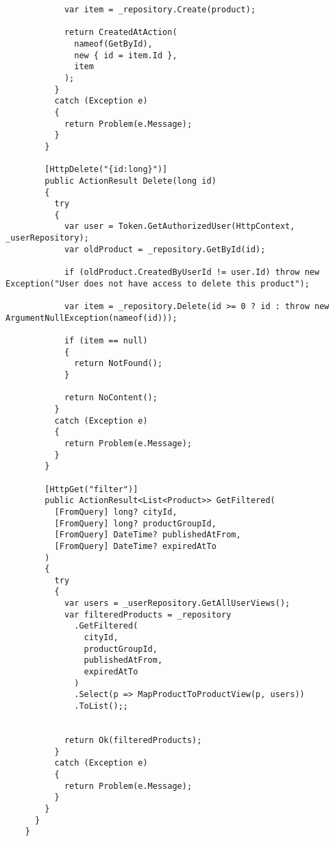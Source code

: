 \begin{lstlisting}
            var item = _repository.Create(product);
    
            return CreatedAtAction(
              nameof(GetById),
              new { id = item.Id },
              item
            );
          }
          catch (Exception e)
          {
            return Problem(e.Message);
          }
        }
    
        [HttpDelete("{id:long}")]
        public ActionResult Delete(long id)
        {
          try
          {
            var user = Token.GetAuthorizedUser(HttpContext, _userRepository);
            var oldProduct = _repository.GetById(id);
    
            if (oldProduct.CreatedByUserId != user.Id) throw new Exception("User does not have access to delete this product");
    
            var item = _repository.Delete(id >= 0 ? id : throw new ArgumentNullException(nameof(id)));
    
            if (item == null)
            {
              return NotFound();
            }
    
            return NoContent();
          }
          catch (Exception e)
          {
            return Problem(e.Message);
          }
        }
    
        [HttpGet("filter")]
        public ActionResult<List<Product>> GetFiltered(
          [FromQuery] long? cityId, 
          [FromQuery] long? productGroupId, 
          [FromQuery] DateTime? publishedAtFrom, 
          [FromQuery] DateTime? expiredAtTo
        )
        {
          try
          {
            var users = _userRepository.GetAllUserViews();
            var filteredProducts = _repository
              .GetFiltered(
                cityId, 
                productGroupId, 
                publishedAtFrom, 
                expiredAtTo
              )
              .Select(p => MapProductToProductView(p, users))
              .ToList();;
            
    
            return Ok(filteredProducts);
          }
          catch (Exception e)
          {
            return Problem(e.Message);
          }
        }
      }
    }
\end{lstlisting}

